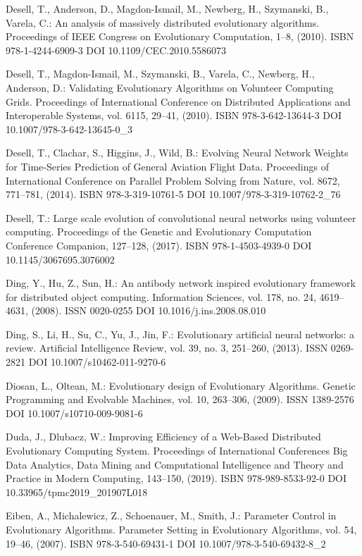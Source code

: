 \begin{thebibliography}{99.}
 Desell, T., Anderson, D., Magdon-Ismail, M., Newberg, H., Szymanski, B., Varela, C.: An analysis of massively distributed evolutionary algorithms. Proceedings of IEEE Congress on Evolutionary Computation, 1--8, (2010). ISBN 978-1-4244-6909-3 DOI 10.1109/CEC.2010.5586073

 Desell, T., Magdon-Ismail, M., Szymanski, B., Varela, C., Newberg, H., Anderson, D.: Validating Evolutionary Algorithms on Volunteer Computing Grids. Proceedings of International Conference on Distributed Applications and Interoperable Systems, vol. 6115, 29--41, (2010). ISBN 978-3-642-13644-3 DOI 10.1007/978-3-642-13645-0\_3

 Desell, T., Clachar, S., Higgins, J., Wild, B.: Evolving Neural Network Weights for Time-Series Prediction of General Aviation Flight Data. Proceedings of International Conference on Parallel Problem Solving from Nature, vol. 8672, 771--781, (2014). ISBN 978-3-319-10761-5 DOI 10.1007/978-3-319-10762-2\_76

 Desell, T.: Large scale evolution of convolutional neural networks using volunteer computing. Proceedings of the Genetic and Evolutionary Computation Conference Companion, 127--128, (2017). ISBN 978-1-4503-4939-0 DOI 10.1145/3067695.3076002

 Ding, Y., Hu, Z., Sun, H.: An antibody network inspired evolutionary framework for distributed object computing. Information Sciences, vol. 178, no. 24, 4619--4631, (2008). ISSN 0020-0255 DOI 10.1016/j.ins.2008.08.010

 Ding, S., Li, H., Su, C., Yu, J., Jin, F.: Evolutionary artificial neural networks: a review. Artificial Intelligence Review, vol. 39, no. 3, 251--260, (2013). ISSN 0269-2821 DOI 10.1007/s10462-011-9270-6

 Diosan, L., Oltean, M.: Evolutionary design of Evolutionary Algorithms. Genetic Programming and Evolvable Machines, vol. 10, 263--306, (2009). ISSN 1389-2576 DOI 10.1007/s10710-009-9081-6

 Duda, J., Dlubacz, W.: Improving Efficiency of a Web-Based Distributed Evolutionary Computing System. Proceedings of International Conferences Big Data Analytics, Data Mining and Computational Intelligence and Theory and Practice in Modern Computing, 143--150, (2019). ISBN 978-989-8533-92-0 DOI 10.33965/tpmc2019\_201907L018

 Eiben, A., Michalewicz, Z., Schoenauer, M., Smith, J.: Parameter Control in Evolutionary Algorithms. Parameter Setting in Evolutionary Algorithms, vol. 54, 19--46, (2007). ISBN 978-3-540-69431-1 DOI 10.1007/978-3-540-69432-8\_2


\end{thebibliography}
